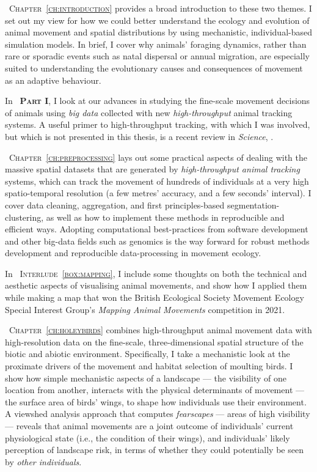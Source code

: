 {\scshape~Chapter~\ref{ch:introduction}} provides a broad introduction to these two themes.
I set out my view for how we could better understand the ecology and evolution of animal movement and spatial distributions by using mechanistic, individual-based simulation models.
In brief, I cover why animals' foraging dynamics, rather than rare or sporadic events such as natal dispersal or annual migration, are especially suited to understanding the evolutionary causes and consequences of movement as an adaptive behaviour.


\medskip

\noindent In {\scshape~\textbf{Part I}}, I look at our advances in studying the fine-scale movement decisions of animals using \textit{big data} collected with new \textit{high-throughput} animal tracking systems.
A useful primer to high-throughput tracking, with which I was involved, but which is not presented in this thesis, is a recent review in \textit{Science},  .

\medskip

{\scshape~Chapter~\ref{ch:preprocessing}} lays out some practical aspects of dealing with the massive spatial datasets that are generated by \textit{high-throughput animal tracking} systems, which can track the movement of hundreds of individuals at a very high spatio-temporal resolution (a few metres' accuracy, and a few seconds' interval).
I cover data cleaning, aggregation, and first principles-based segmentation-clustering, as well as how to implement these methods in reproducible and efficient ways.
Adopting computational best-practices from software development and other big-data fields such as genomics is the way forward for robust methods development and reproducible data-processing in movement ecology.

\medskip

\noindent In {\scshape~Interlude~\ref{box:mapping}}, I include some thoughts on both the technical and aesthetic aspects of visualising animal movements, and show how I applied them while making a map that won the British Ecological Society Movement Ecology Special Interest Group's \emph{Mapping Animal Movements} competition in 2021.

\medskip

{\scshape~Chapter~\ref{ch:holeybirds}} combines high-throughput animal movement data with high-resolution data on the fine-scale, three-dimensional spatial structure of the biotic and abiotic environment.
Specifically, I take a mechanistic look at the proximate drivers of the movement and habitat selection of moulting birds.
I show how simple mechanistic aspects of a landscape --- the visibility of one location from another, interacts with the physical determinants of movement --- the surface area of birds' wings, to shape how individuals use their environment.
A viewshed analysis approach that computes \textit{fearscapes} --- areas of high visibility --- reveals that animal movements are a joint outcome of individuals' current physiological state (i.e., the condition of their wings), and individuals' likely perception of landscape risk, in terms of whether they could potentially be seen by \textit{other individuals}.

